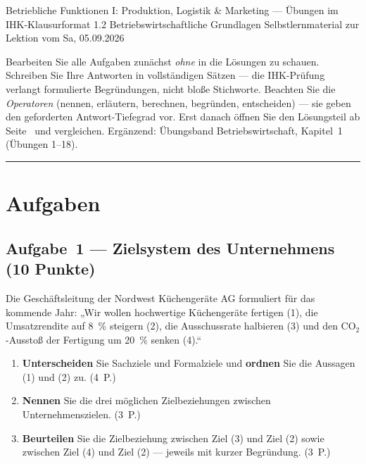 \documentclass[11pt, a4paper]{article}
\begin{document}
%
  {Betriebliche Funktionen I: Produktion, Logistik \& Marketing --- Übungen im IHK-Klausurformat}%
  {1.2 Betriebswirtschaftliche Grundlagen}%
  {Selbstlernmaterial zur Lektion vom Sa, 05.09.2026}


\begin{merksatz}[title={\bfseries So nutzen Sie dieses Aufgabenheft}]
Bearbeiten Sie alle Aufgaben zunächst \emph{ohne} in die Lösungen zu schauen. Schreiben
Sie Ihre Antworten in vollständigen Sätzen --- die IHK-Prüfung verlangt formulierte
Begründungen, nicht bloße Stichworte. Beachten Sie die \emph{Operatoren} (nennen,
erläutern, berechnen, begründen, entscheiden) --- sie geben den geforderten
Antwort-Tiefegrad vor. Erst danach öffnen Sie den Lösungsteil ab
Seite~\pageref{loesungen} und vergleichen. Ergänzend: Übungsband Betriebswirtschaft,
Kapitel~1 (Übungen 1--18).
\end{merksatz}

\tableofcontents
\vspace{1em}
\hrule

\section{Aufgaben}

\subsection*{Aufgabe~1 --- Zielsystem des Unternehmens (10 Punkte)}

Die Geschäftsleitung der Nordwest Küchengeräte AG formuliert für das kommende Jahr:
„Wir wollen hochwertige Küchengeräte fertigen (1), die Umsatzrendite auf 8~\% steigern
(2), die Ausschussrate halbieren (3) und den CO$_2$-Ausstoß der Fertigung um 20~\%
senken (4).``

\begin{enumerate}[label=(\alph*)]
  \item \textbf{Unterscheiden} Sie Sachziele und Formalziele und \textbf{ordnen} Sie die Aussagen (1) und (2) zu. \hfill (4~P.)
  \item \textbf{Nennen} Sie die drei möglichen Zielbeziehungen zwischen Unternehmenszielen. \hfill (3~P.)
  \item \textbf{Beurteilen} Sie die Zielbeziehung zwischen Ziel (3) und Ziel (2) sowie zwischen Ziel (4) und Ziel (2) --- jeweils mit kurzer Begründung. \hfill (3~P.)
\end{enumerate}
\end{document}
